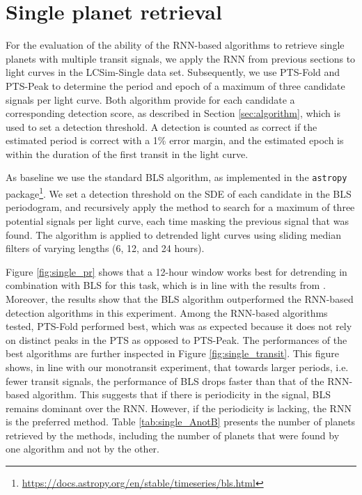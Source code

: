 
\section{Single planet retrieval}
\label{sec:singles}

For the evaluation of the ability of the RNN-based algorithms to retrieve single planets with multiple transit signals, we apply the RNN from previous sections to light curves in the LCSim-Single data set. Subsequently, we use PTS-Fold and PTS-Peak to determine the period and epoch of a maximum of three candidate signals per light curve. Both algorithm provide for each candidate a corresponding detection score, as described in Section \ref{sec:algorithm}, which is used to set a detection threshold. A detection is counted as correct if the estimated period is correct with a 1\% error margin, and the estimated epoch is within the duration of the first transit in the light curve.

As baseline we use the standard BLS algorithm, as implemented in the \texttt{astropy} package\footnote{\url{https://docs.astropy.org/en/stable/timeseries/bls.html}}. We set a detection threshold on the SDE of each candidate in the BLS periodogram, and recursively apply the method to search for a maximum of three potential signals per light curve, each time masking the previous signal that was found. The algorithm is applied to detrended light curves using sliding median filters of varying lengths (6, 12, and 24 hours).

Figure \ref{fig:single_pr} shows that a 12-hour window works best for detrending in combination with BLS for this task, which is in line with the results from \cite{hippke2019wotan}. Moreover, the results show that the BLS algorithm outperformed the RNN-based detection algorithms in this experiment. Among the RNN-based algorithms tested, PTS-Fold performed best, which was as expected because it does not rely on distinct peaks in the PTS as opposed to PTS-Peak. The performances of the best algorithms are further inspected in Figure \ref{fig:single_transit}. This figure shows, in line with our monotransit experiment, that towards larger periods, i.e. fewer transit signals, the performance of BLS drops faster than that of the RNN-based algorithm. This suggests that if there is periodicity in the signal, BLS remains dominant over the RNN. However, if the periodicity is lacking, the RNN is the preferred method. Table \ref{tab:single_AnotB} presents the number of planets retrieved by the methods, including the number of planets that were found by one algorithm and not by the other.

